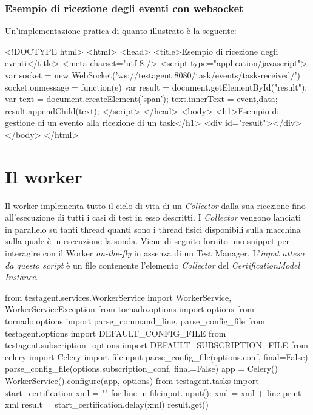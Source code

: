 \documentclass[../main.tex]{subfiles}
\begin{document}
\subsubsection{Esempio di ricezione degli eventi con websocket}
Un'implementazione pratica di quanto illustrato è la seguente:
\begin{html}
<!DOCTYPE html>
<html>
    <head>
        <title>Esempio di ricezione degli eventi</title>
        <meta charset="utf-8 />
        <script type="application/javascript">
            var socket = new WebSocket('ws://testagent:8080/task/events/task-received/')
            socket.onmessage = function(e) {
                var result = document.getElementById("result");
                var text = document.createElement('span');
                text.innerText = event,data;
                result.appendChild(text);
            }
        </script>
    </head>
    <body>
        <h1>Esempio di gestione di un evento alla ricezione di un task</h1>
        <div id="result"></div>
    </body>
</html>
\end{html}
\section{Il worker}
Il worker implementa tutto il ciclo di vita di un \textit{Collector} dalla sua ricezione fino all'esecuzione di tutti i casi di test in esso descritti.
I \textit{Collector} vengono lanciati in parallelo su tanti thread quanti sono i thread fisici disponibili sulla macchina sulla quale è in esecuzione la sonda.
Viene di seguito fornito uno snippet per interagire con il Worker \textit{on-the-fly} in assenza di un Test Manager.
L'\textit{input atteso da questo script} è un file contenente l'elemento \textit{Collector} del \textit{CertificationModel Instance}.

\begin{python}
from testagent.services.WorkerService import WorkerService, WorkerServiceException
from tornado.options import options
from tornado.options import parse_command_line, parse_config_file
from testagent.options import DEFAULT_CONFIG_FILE
from testagent.subscription_options import DEFAULT_SUBSCRIPTION_FILE
from celery import Celery
import fileinput
parse_config_file(options.conf, final=False)
parse_config_file(options.subscription_conf, final=False)
app = Celery()
WorkerService().configure(app, options)
from testagent.tasks import start_certification
xml = ""
for line in fileinput.input():
    xml = xml + line 
print xml
result = start_certification.delay(xml)
result.get()
\end{python}
\end{document}
